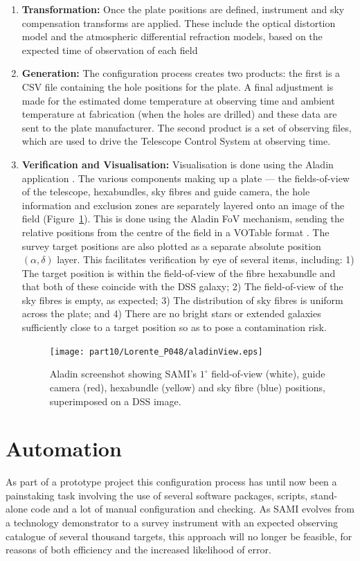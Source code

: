 \begin{enumerate}
\item{\bf Transformation:} Once the plate positions are defined,
  instrument and sky compensation transforms are applied. These
  include the optical distortion model and the atmospheric
  differential refraction models, based on the expected time of
  observation of each field

\item{\bf Generation:} The configuration process creates two products:
  the first is a CSV file containing the hole positions for the plate. A final
  adjustment is made for the estimated dome temperature at observing time
  and ambient temperature at fabrication (when the holes are drilled)
  and these data are sent to the plate manufacturer. The second
  product is a set of observing files, which are used to drive the Telescope
  Control System at observing time.

\item{\bf Verification and Visualisation:} Visualisation is done using
  the Aladin application \citep{2000bfb+}. The various components
  making up a plate --- the fields-of-view of the telescope,
  hexabundles, sky fibres and guide camera, the hole information and
  exclusion zones are separately layered onto an image of the
  field (Figure~\ref{p048_FigAladin}). This is done using the Aladin FoV mechanism, sending the
  relative positions from the centre of the field in a VOTable
  format \citep{2011owd+}. The survey target positions are also plotted as a separate
  absolute position $(\alpha, \delta)$ layer. This facilitates
  verification by eye of several items, including:
1) The target position is within the field-of-view of the fibre
  hexabundle and that both of these coincide with the DSS galaxy;
2) The field-of-view of the sky fibres is empty, as expected;
3) The distribution of sky fibres is uniform across the plate; and
4) There are no bright stars or extended galaxies sufficiently
  close to a target position so as to pose a contamination risk.

\begin{figure}[ht]
\centering
\texttt{[image: part10/Lorente\_P048/aladinView.eps]}
\caption{Aladin screenshot showing SAMI's $1^\circ$ field-of-view (white),
  guide camera (red), hexabundle (yellow)
  and sky fibre (blue) positions, superimposed on a DSS image.}
\label{p048_FigAladin}
\end{figure}

\end{enumerate}


\section{Automation}
As part of a prototype project this configuration process has until
now been a painstaking task involving the use of several software
packages, scripts, stand-alone code and a lot of manual configuration
and checking. As SAMI evolves from a technology demonstrator to a
survey instrument with an expected observing catalogue of several
thousand targets, this approach will no longer be feasible, for
reasons of both efficiency and the increased likelihood of error.

